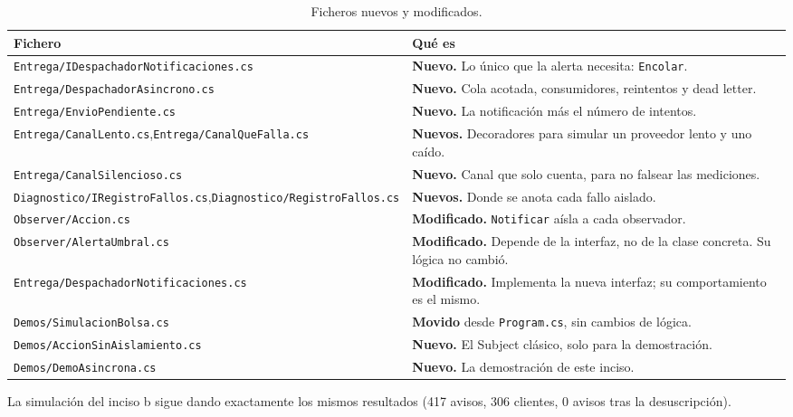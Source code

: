 \begin{table}[H]
\centering
\small
\begin{tabularx}{\textwidth}{>{\raggedright\arraybackslash}p{6.4cm} >{\raggedright\arraybackslash}X}
\toprule
\textbf{Fichero} & \textbf{Qué es} \\
\midrule
\texttt{Entrega/IDespachadorNotificaciones.cs} & \textbf{Nuevo.} Lo único que la alerta necesita: \texttt{Encolar}. \\
\texttt{Entrega/DespachadorAsincrono.cs} & \textbf{Nuevo.} Cola acotada, consumidores, reintentos y dead letter. \\
\texttt{Entrega/EnvioPendiente.cs} & \textbf{Nuevo.} La notificación más el número de intentos. \\
\texttt{Entrega/CanalLento.cs},\newline\texttt{Entrega/CanalQueFalla.cs} & \textbf{Nuevos.} Decoradores para simular un proveedor lento y uno caído. \\
\texttt{Entrega/CanalSilencioso.cs} & \textbf{Nuevo.} Canal que solo cuenta, para no falsear las mediciones. \\
\texttt{Diagnostico/IRegistroFallos.cs},\newline\texttt{Diagnostico/RegistroFallos.cs} & \textbf{Nuevos.} Donde se anota cada fallo aislado. \\
\texttt{Observer/Accion.cs} & \textbf{Modificado.} \texttt{Notificar} aísla a cada observador. \\
\texttt{Observer/AlertaUmbral.cs} & \textbf{Modificado.} Depende de la interfaz, no de la clase concreta. Su lógica no cambió. \\
\texttt{Entrega/DespachadorNotificaciones.cs} & \textbf{Modificado.} Implementa la nueva interfaz; su comportamiento es el mismo. \\
\texttt{Demos/SimulacionBolsa.cs} & \textbf{Movido} desde \texttt{Program.cs}, sin cambios de lógica. \\
\texttt{Demos/AccionSinAislamiento.cs} & \textbf{Nuevo.} El Subject clásico, solo para la demostración. \\
\texttt{Demos/DemoAsincrona.cs} & \textbf{Nuevo.} La demostración de este inciso. \\
\bottomrule
\end{tabularx}
\caption{Ficheros nuevos y modificados.}
\end{table}

La simulación del inciso b sigue dando exactamente los mismos resultados (417 avisos, 306
clientes, 0 avisos tras la desuscripción).


